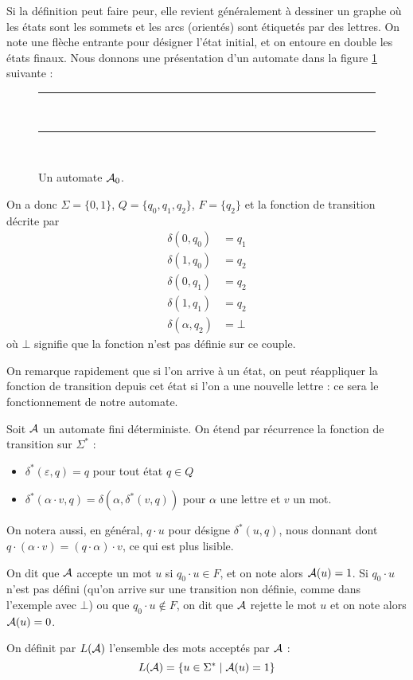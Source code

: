 Si la définition peut faire peur, elle revient généralement à dessiner un graphe où les états sont les sommets et les arcs (orientés) sont étiquetés par des lettres. On note une flèche entrante pour désigner l'état initial, et on entoure en double les états finaux. Nous donnons une présentation d'un automate dans la figure \ref{fig:automate1} suivante :

\begin{figure}[h]
    \centering
    \rule{17cm}{0.5pt}\\
    \vspace{0.5cm}
    
    \rule{17cm}{0.5pt}\\
    \vspace{0.5cm}
    \caption{Un automate $\mathcal A_0$.}
    \label{fig:automate1}
\end{figure}

On a donc $\Sigma = \{0,1\}$, $Q=\{q_0,q_1,q_2\}$, $F=\{q_2\}$ et la fonction de transition décrite par \begin{align*}
    \delta (0,q_0) &= q_1\\
    \delta (1,q_0) &= q_2\\
    \delta (0,q_1) &= q_2\\
    \delta (1,q_1) &= q_2\\
    \delta (\alpha,q_2) &= \bot
\end{align*}
 où $\bot$ signifie que la fonction n'est pas définie sur ce couple.

 On remarque rapidement que si l'on arrive à un état, on peut réappliquer la fonction de transition depuis cet état si l'on a une nouvelle lettre : ce sera le fonctionnement de notre automate.

 \begin{defi}
     Soit $\mathcal A$ un automate fini déterministe. On étend par récurrence la fonction de transition sur $\Sigma^*$ : \begin{itemize}[label=$\bullet$]
         \item $\delta^*(\varepsilon,q) = q$ pour tout état $q\in Q$
         \item $\delta^*(\alpha\cdot v,q) = \delta(\alpha,\delta^*(v,q))$ pour $\alpha$ une lettre et $v$ un mot.
     \end{itemize}

     On notera aussi, en général, $q\cdot u$ pour désigne $\delta^*(u,q)$, nous donnant dont $q\cdot (\alpha\cdot v) = (q\cdot \alpha)\cdot v$, ce qui est plus lisible.

     On dit que $\mathcal A$ accepte un mot $u$ si $q_0\cdot u \in F$, et on note alors $\mathcal A(u)=1$. Si $q_0\cdot u$ n'est pas défini (qu'on arrive sur une transition non définie, comme dans l'exemple avec $\bot$) ou que $q_0\cdot u \notin F$, on dit que $\mathcal A$ rejette le mot $u$ et on note alors $\mathcal A(u)=0$.

     On définit par $L(\mathcal A)$ l'ensemble des mots acceptés par $\mathcal A$ : $$L(\mathcal A) =\{u\in \Sigma^*\mid \mathcal A(u)=1\}$$
 \end{defi}

